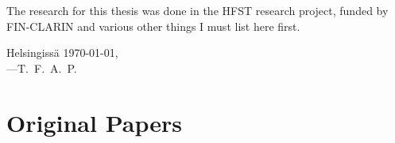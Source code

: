 \documentclass[officiallayout]{unihelcompling}
\begin{document}
The research for this thesis was done in the HFST research project, funded by
FIN-CLARIN and various other things I must list here first.

\textfinnish{Helsingissä \today,\\
---T.~F.~A.~P.}

\chapter*{Original Papers}
\label{chap:papers}
\end{document}
